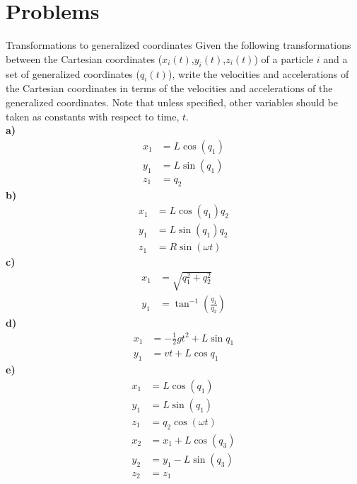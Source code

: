 %
\section{Problems}
\begin{problem}{Transformations to generalized coordinates}
\label{prob_Intro_1}
Given the following transformations between the Cartesian coordinates ($x_i(t)$,$y_i(t)$,$z_i(t)$) of a particle $i$ and a set of generalized coordinates ($q_i(t)$), write the velocities and accelerations of the Cartesian coordinates in terms of the velocities and accelerations of the generalized coordinates. Note that unless specified, other variables should be taken as constants with respect to time, $t$.\\
\textbf{a)}
 \begin{align*}
x_1&=L\cos(q_1)\\
y_1&=L\sin(q_1)\\
z_1&=q_2
\end{align*}
\textbf{b)}
\begin{align*}
x_1&=L\cos(q_1)q_2\\
y_1&=L\sin(q_1)q_2\\
z_1&=R\sin(\omega t)
\end{align*}
\textbf{c)}
\begin{align*}
x_1&=\sqrt{q_1^2+q_2^2}\\
y_1&=\tan^{-1}\left(\frac{q_1}{q_2}\right)
\end{align*}
\textbf{d)}
\begin{align*}
x_1&=-\frac{1}{2}gt^2+L\sin{q_1}\\
y_1&=vt+L\cos{q_1}
\end{align*}
\textbf{e)}
\begin{align*}
x_1&=L\cos(q_1)\\
y_1&=L\sin(q_1)\\
z_1&=q_2 \cos(\omega t)\\
x_2&=x_1+L\cos(q_3)\\
y_2&=y_1-L\sin(q_3)\\
z_2&=z_1
\end{align*}
\end{problem}
